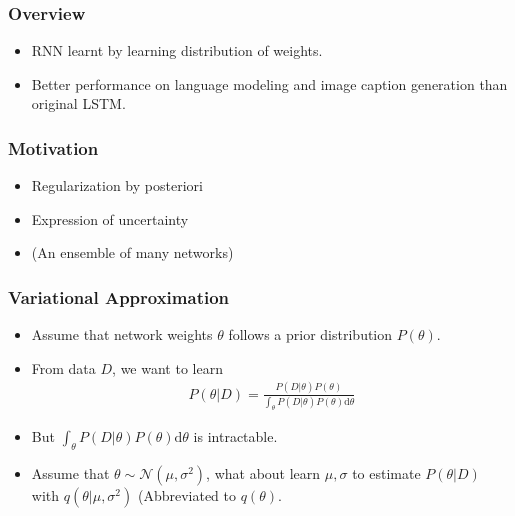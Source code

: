 \begin{frame}
  \frametitle{Overview}
  \begin{itemize}
  \item RNN learnt by learning distribution of weights.
  \item Better performance on language modeling and image caption generation than original LSTM.
  \end{itemize}
\end{frame}


\begin{frame}
  \frametitle{Motivation}
  \begin{itemize}
  \item Regularization by posteriori
  \item Expression of uncertainty
  \item (An ensemble of many networks)
  \end{itemize}
\end{frame}


\begin{frame}
  \frametitle{Variational Approximation}
  \begin{itemize}
  \item Assume that network weights $\theta$ follows a prior distribution $P(\theta)$.
  \item From data $D$, we want to learn 
    \begin{align*}
      P(\theta | D) = \frac{P(D | \theta) P(\theta)}{\int_\theta P(D | \theta) P(\theta) \mathrm{d}\theta }
    \end{align*}
  \item But $\int_\theta P(D | \theta) P(\theta) \mathrm{d}\theta$ is intractable.
  \item Assume that $\theta \sim \mathcal{N}(\mu, \sigma^2)$, what about learn $\mu, \sigma$ to estimate $P(\theta | D)$ with $q(\theta | \mu, \sigma^2)$ (Abbreviated to $q(\theta)$.
  \end{itemize}
\end{frame}


